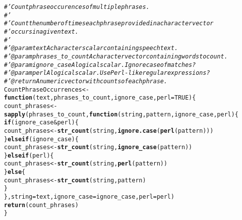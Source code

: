 \documentclass{article}\usepackage[]{graphicx}\usepackage[]{color}
\makeatletter
\newcommand{\hlnum}[1]{\textcolor[rgb]{0.686,0.059,0.569}{#1}}%
\newcommand{\hlcom}[1]{\textcolor[rgb]{0.678,0.584,0.686}{\textit{#1}}}%
\newcommand{\hlopt}[1]{\textcolor[rgb]{0,0,0}{#1}}%
\newcommand{\hlstd}[1]{\textcolor[rgb]{0.345,0.345,0.345}{#1}}%
\newcommand{\hlkwa}[1]{\textcolor[rgb]{0.161,0.373,0.58}{\textbf{#1}}}%
\newcommand{\hlkwb}[1]{\textcolor[rgb]{0.69,0.353,0.396}{#1}}%
\newcommand{\hlkwc}[1]{\textcolor[rgb]{0.333,0.667,0.333}{#1}}%
\newcommand{\hlkwd}[1]{\textcolor[rgb]{0.737,0.353,0.396}{\textbf{#1}}}%
\newenvironment{kframe}{%
 \def\at@end@of@kframe{}%
 \ifinner\ifhmode%
  \def\at@end@of@kframe{\end{minipage}}%
  \begin{minipage}{\columnwidth}%
 \fi\fi%
 \def\FrameCommand##1{\hskip\@totalleftmargin \hskip-\fboxsep
 \colorbox{shadecolor}{##1}\hskip-\fboxsep
     \hskip-\linewidth \hskip-\@totalleftmargin \hskip\columnwidth}%
 \MakeFramed {\advance\hsize-\width
   \@totalleftmargin\z@ \linewidth\hsize
   \@setminipage}}%
 {\par\unskip\endMakeFramed%
 \at@end@of@kframe}
\newenvironment{knitrout}{}{} %
\makeatother
\begin{document}
\begin{knitrout}
\begin{kframe}
\begin{alltt}
\hlcom{#' Count phrase occurences of multiple phrases.}
\hlcom{#' }
\hlcom{#' Count the number of times each phrase provided in a character vector }
\hlcom{#' occurs in a given text.}
\hlcom{#' }
\hlcom{#' @param text A character scalar containing speech text.}
\hlcom{#' @param phrases_to_count A character vector containing words to count.}
\hlcom{#' @param ignore_case A logical scalar. Ignore case of matches?}
\hlcom{#' @param perl A logical scalar. Use Perl-like regular expressions?}
\hlcom{#' @return A numeric vector with counts of each phrase.}
\hlstd{CountPhraseOccurrences} \hlkwb{<-} \hlkwa{function}\hlstd{(}\hlkwc{text}\hlstd{,} \hlkwc{phrases_to_count}\hlstd{,} \hlkwc{ignore_case}\hlstd{,} \hlkwc{perl} \hlstd{=} \hlnum{TRUE}\hlstd{) \{}
  \hlstd{count_phrases} \hlkwb{<-} \hlkwd{sapply}\hlstd{(phrases_to_count,} \hlkwa{function}\hlstd{(}\hlkwc{string}\hlstd{,} \hlkwc{pattern}\hlstd{,} \hlkwc{ignore_case}\hlstd{,} \hlkwc{perl}\hlstd{) \{}
    \hlkwa{if} \hlstd{(ignore_case} \hlopt{&} \hlstd{perl) \{}
      \hlstd{count_phrases} \hlkwb{<-} \hlkwd{str_count}\hlstd{(string,} \hlkwd{ignore.case}\hlstd{(}\hlkwd{perl}\hlstd{(pattern)))}
    \hlstd{\}} \hlkwa{else if} \hlstd{(ignore_case) \{}
      \hlstd{count_phrases} \hlkwb{<-} \hlkwd{str_count}\hlstd{(string,} \hlkwd{ignore_case}\hlstd{(pattern))}
    \hlstd{\}} \hlkwa{else if} \hlstd{(perl) \{}
      \hlstd{count_phrases} \hlkwb{<-} \hlkwd{str_count}\hlstd{(string,} \hlkwd{perl}\hlstd{(pattern))}
    \hlstd{\}} \hlkwa{else} \hlstd{\{}
      \hlstd{count_phrases} \hlkwb{<-} \hlkwd{str_count}\hlstd{(string, pattern)}
    \hlstd{\}}
  \hlstd{\},} \hlkwc{string} \hlstd{= text,} \hlkwc{ignore_case} \hlstd{= ignore_case,} \hlkwc{perl} \hlstd{= perl)}
  \hlkwd{return}\hlstd{(count_phrases)}
\hlstd{\}}
\end{alltt}
\end{kframe}
\end{knitrout}
\end{document}
